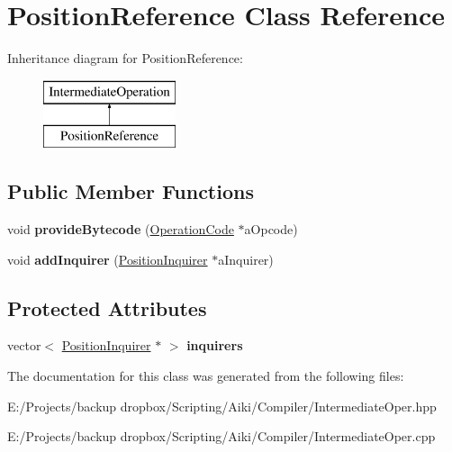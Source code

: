 \hypertarget{a00019}{\section{Position\+Reference Class Reference}
\label{a00019}
}
Inheritance diagram for Position\+Reference\+:\begin{figure}[H]
\begin{center}
\leavevmode
\includegraphics[height=2.000000cm]{dd/da2/a00019}
\end{center}
\end{figure}
\subsection*{Public Member Functions}
\begin{DoxyCompactItemize}
\item 
\hypertarget{a00019_a2238ecbb4faec2237cf7f53faa493251}{void {\bfseries provide\+Bytecode} (\hyperlink{a00015}{Operation\+Code} $\ast$a\+Opcode)}\label{a00019_a2238ecbb4faec2237cf7f53faa493251}

\item 
\hypertarget{a00019_a2ab1c0ad4c5beef59cae0c4de79700d1}{void {\bfseries add\+Inquirer} (\hyperlink{a00018}{Position\+Inquirer} $\ast$a\+Inquirer)}\label{a00019_a2ab1c0ad4c5beef59cae0c4de79700d1}

\end{DoxyCompactItemize}
\subsection*{Protected Attributes}
\begin{DoxyCompactItemize}
\item 
\hypertarget{a00019_a3142d041007ed1ff0606810d07259859}{vector$<$ \hyperlink{a00018}{Position\+Inquirer} $\ast$ $>$ {\bfseries inquirers}}\label{a00019_a3142d041007ed1ff0606810d07259859}

\end{DoxyCompactItemize}


The documentation for this class was generated from the following files\+:\begin{DoxyCompactItemize}
\item 
E\+:/\+Projects/backup dropbox/\+Scripting/\+Aiki/\+Compiler/Intermediate\+Oper.\+hpp\item 
E\+:/\+Projects/backup dropbox/\+Scripting/\+Aiki/\+Compiler/Intermediate\+Oper.\+cpp\end{DoxyCompactItemize}
